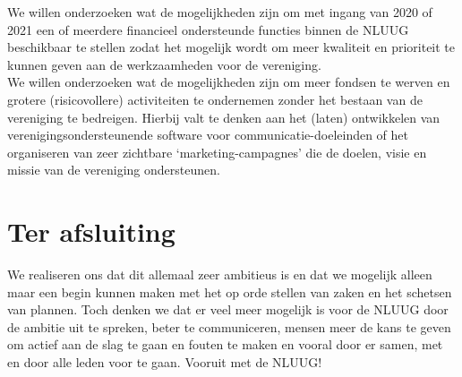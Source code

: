 \documentclass{article}
\begin{document}
We willen onderzoeken wat de mogelijkheden zijn om met ingang van 2020 of 2021 een of meerdere financieel ondersteunde functies binnen de NLUUG beschikbaar te stellen zodat het mogelijk wordt om meer kwaliteit en prioriteit te kunnen geven aan de werkzaamheden voor de vereniging. \\

We willen onderzoeken wat de mogelijkheden zijn om meer fondsen te werven en grotere (risicovollere) activiteiten te ondernemen zonder het bestaan van de vereniging te bedreigen. Hierbij valt te denken aan het (laten) ontwikkelen van verenigingsondersteunende software voor communicatie-doeleinden of het organiseren van zeer zichtbare `marketing-campagnes' die de doelen, visie en missie van de vereniging ondersteunen. \\

\section{Ter afsluiting}
We realiseren ons dat dit allemaal zeer ambitieus is en dat we mogelijk alleen maar een begin kunnen maken met het op orde stellen van zaken en het schetsen van plannen. Toch denken we dat er veel meer mogelijk is voor de NLUUG door de ambitie uit te spreken, beter te communiceren, mensen meer de kans te geven om actief aan de slag te gaan en fouten te maken en vooral door er samen, met en door alle leden voor te gaan. Vooruit met de NLUUG!
\end{document}
